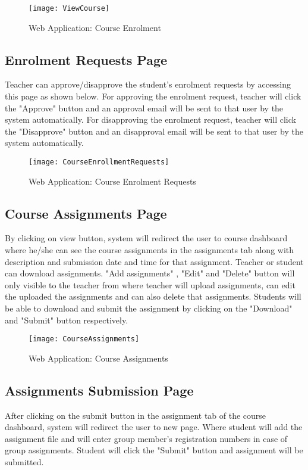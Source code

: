 \begin{figure}[h]
  \centering
  \texttt{[image: ViewCourse]}
  \caption{Web Application: Course Enrolment}
\end{figure}

\subsection{Enrolment Requests Page}
Teacher can approve/disapprove the student's enrolment requests by accessing this page as shown below.  For approving the enrolment request, teacher will click the "Approve" button and an approval email will be sent to that user by the system automatically. For disapproving the enrolment request, teacher will click the "Disapprove" button and an disapproval email will be sent to that user by the system automatically.

\begin{figure}[h]
  \centering
  \texttt{[image: CourseEnrollmentRequests]}
  \caption{Web Application: Course Enrolment Requests}
\end{figure}

\subsection{Course Assignments Page}
By clicking on view button, system will redirect the user to course dashboard where he/she can see the course assignments in the assignments tab along with description and submission date and time for that assignment.  Teacher or student can download assignments. "Add assignments" , "Edit" and "Delete" button will only visible to the teacher from where teacher will upload assignments, can edit the uploaded the assignments and can also delete that assignments. Students will be able to download and submit the assignment by clicking on the "Download" and "Submit" button respectively. 

\begin{figure}[h]
  \centering
  \texttt{[image: CourseAssignments]}
  \caption{Web Application: Course Assignments}
\end{figure}

\subsection{Assignments Submission Page}
After clicking on the submit button in the assignment tab of the course dashboard, system will redirect the user to new page. Where student will add the assignment file and will enter group member's registration numbers in case of group assignments.  Student will click the "Submit" button and assignment will be submitted.

